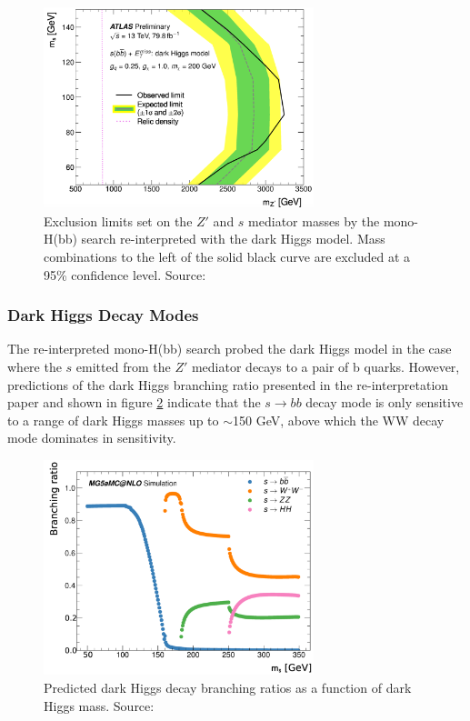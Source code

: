 \documentclass[12pt]{article}
\begin{document}
\begin{figure}[H]
	\centering
	\includegraphics[width=0.7\textwidth]{figures/monosbb_exclusion.png}
	\caption[]{Exclusion limits set on the $Z'$ and $s$ mediator masses by the mono-H(bb) search re-interpreted with the dark Higgs model. Mass combinations to the left of the solid black curve are excluded at a 95\% confidence level. Source: \cite{monohbb_recast}}
	\label{fig:monosbb_exclusion}
\end{figure}


\subsubsection{Dark Higgs Decay Modes}

The re-interpreted mono-H(bb) search probed the dark Higgs model in the case where the $s$ emitted from the $Z'$ mediator decays to a pair of b quarks. However, predictions of the dark Higgs branching ratio presented in the re-interpretation paper \cite{monohbb_recast} and shown in figure \ref{fig:Higgsbrs} indicate that the $s \rightarrow bb$ decay mode is only sensitive to a range of dark Higgs masses up to $\sim$150 GeV, above which the WW decay mode dominates in sensitivity. 

\begin{figure}[H]
	\centering
	\includegraphics[width=0.7\textwidth]{figures/BR_vs_mass.png}
	\caption[]{Predicted dark Higgs decay branching ratios as a function of dark Higgs mass. Source: \cite{monohbb_recast} }
	\label{fig:Higgsbrs}
\end{figure}
\end{document}
